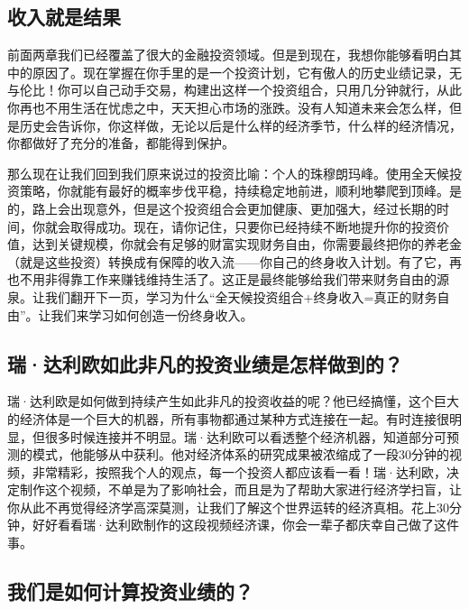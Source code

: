 \subsection{收入就是结果}

前面两章我们已经覆盖了很大的金融投资领域。但是到现在，我想你能够看明白其中的原因了。现在掌握在你手里的是一个投资计划，它有傲人的历史业绩记录，无与伦比！你可以自己动手交易，构建出这样一个投资组合，只用几分钟就行，从此你再也不用生活在忧虑之中，天天担心市场的涨跌。没有人知道未来会怎么样，但是历史会告诉你，你这样做，无论以后是什么样的经济季节，什么样的经济情况，你都做好了充分的准备，都能得到保护。

那么现在让我们回到我们原来说过的投资比喻：个人的珠穆朗玛峰。使用全天候投资策略，你就能有最好的概率步伐平稳，持续稳定地前进，顺利地攀爬到顶峰。是的，路上会出现意外，但是这个投资组合会更加健康、更加强大，经过长期的时间，你就会取得成功。现在，请你记住，只要你已经持续不断地提升你的投资价值，达到关键规模，你就会有足够的财富实现财务自由，你需要最终把你的养老金（就是这些投资）转换成有保障的收入流——你自己的终身收入计划。有了它，再也不用非得靠工作来赚钱维持生活了。这正是最终能够给我们带来财务自由的源泉。让我们翻开下一页，学习为什么“全天候投资组合+终身收入=真正的财务自由”。让我们来学习如何创造一份终身收入。

\subsection{瑞·达利欧如此非凡的投资业绩是怎样做到的？}

瑞·达利欧是如何做到持续产生如此非凡的投资收益的呢？他已经搞懂，这个巨大的经济体是一个巨大的机器，所有事物都通过某种方式连接在一起。有时连接很明显，但很多时候连接并不明显。瑞·达利欧可以看透整个经济机器，知道部分可预测的模式，他能够从中获利。他对经济体系的研究成果被浓缩成了一段30分钟的视频，非常精彩，按照我个人的观点，每一个投资人都应该看一看！瑞·达利欧，决定制作这个视频，不单是为了影响社会，而且是为了帮助大家进行经济学扫盲，让你从此不再觉得经济学高深莫测，让我们了解这个世界运转的经济真相。花上30分钟，好好看看瑞·达利欧制作的这段视频经济课，你会一辈子都庆幸自己做了这件事。

\subsection{我们是如何计算投资业绩的？}


